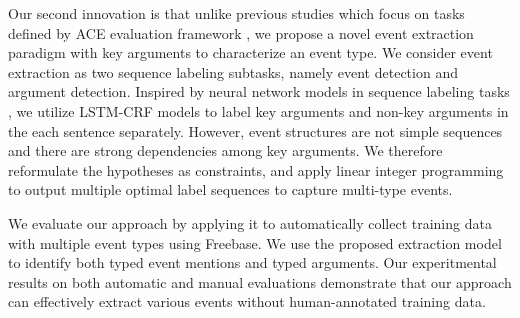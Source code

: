 


Our second innovation is that unlike previous studies which focus on tasks defined by ACE evaluation framework \cite{ahn2006stages,li2013joint,chen2015event,nguyen2016joint}, we propose a novel event extraction paradigm with key arguments to characterize an event type. We consider event extraction as two sequence labeling subtasks, namely event detection and argument detection. Inspired by neural network models in sequence labeling tasks \cite{huang2015bidirectional,lample2016neural}, we utilize LSTM-CRF models to label key arguments and non-key arguments in the each sentence separately. However, event structures are not simple sequences and there are strong dependencies among key arguments. We therefore reformulate the hypotheses as constraints, and apply linear integer programming to output multiple optimal label sequences to capture multi-type events.

We evaluate our approach by applying it to automatically collect training data with multiple event types using Freebase. 
We use the proposed extraction model to identify both typed event mentions and typed arguments. Our experitmental
results on both automatic and
manual evaluations demonstrate that our approach can effectively extract
various events without human-annotated training data. 


